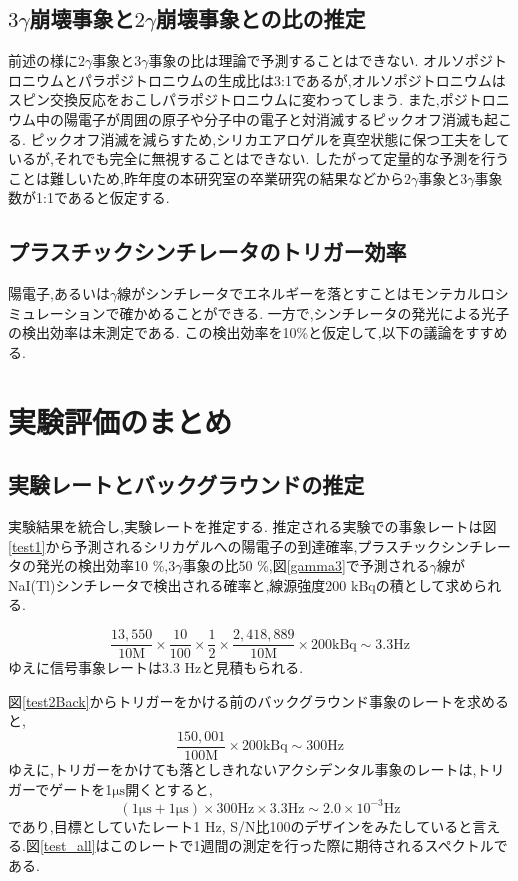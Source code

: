 \subsection{$3\gamma$崩壊事象と$2\gamma$崩壊事象との比の推定}
前述の様に$2\gamma$事象と$3\gamma$事象の比は理論で予測することはできない.
オルソポジトロニウムとパラポジトロニウムの生成比は3:1であるが,オルソポジトロニウムはスピン交換反応をおこしパラポジトロニウムに変わってしまう.
また,ポジトロニウム中の陽電子が周囲の原子や分子中の電子と対消滅するピックオフ消滅も起こる.
ピックオフ消滅を減らすため,シリカエアロゲルを真空状態に保つ工夫をしているが,それでも完全に無視することはできない.
したがって定量的な予測を行うことは難しいため,昨年度の本研究室の卒業研究の結果\cite{卒業論文2015}などから$2\gamma$事象と$3\gamma$事象数が1:1であると仮定する.


\subsection{プラスチックシンチレータのトリガー効率}
陽電子,あるいは$\gamma$線がシンチレータでエネルギーを落とすことはモンテカルロシミュレーションで確かめることができる.
一方で,シンチレータの発光による光子の検出効率は未測定である.
この検出効率を10\%と仮定して,以下の議論をすすめる.

\section{実験評価のまとめ}
\label{section_testall}

\subsection{実験レートとバックグラウンドの推定}
実験結果を統合し,実験レートを推定する.
推定される実験での事象レートは図\ref{test1}から予測されるシリカゲルへの陽電子の到達確率,プラスチックシンチレータの発光の検出効率10 \%,$3\gamma$事象の比50 \%,図\ref{gamma3}で予測される$\gamma$線がNaI(Tl)シンチレータで検出される確率と,線源強度200 kBqの積として求められる.

\begin{equation}
	\nonumber
	\frac{13,550}{10 \mathrm{M}} \times \frac{10}{100} \times \frac{1}{2} \times \frac{2,418,889}{10 \mathrm{M}} \times 200 \mathrm{kBq} \sim 3.3 \mathrm{Hz}
\end{equation}
ゆえに信号事象レートは3.3 Hzと見積もられる.

図\ref{test2Back}からトリガーをかける前のバックグラウンド事象のレートを求めると,
\begin{equation}
	\nonumber
	\frac{150,001}{100\mathrm{M}} \times 200 \mathrm{kBq} \sim 300 \mathrm{ Hz}
\end{equation}
ゆえに,トリガーをかけても落としきれないアクシデンタル事象のレートは,トリガーでゲートを1$\si{\micro \second}$開くとすると,
\begin{equation}
	\nonumber
	( 1 \si{\micro \second} + 1 \si{\micro \second}) \times  300 \mathrm{Hz} \times 3.3 \mathrm{Hz} \sim 2.0 \times 10^{-3} \mathrm{Hz}
\end{equation}
であり,目標としていたレート1 Hz, S/N比100のデザインをみたしていると言える.図\ref{test_all}はこのレートで1週間の測定を行った際に期待されるスペクトルである.

